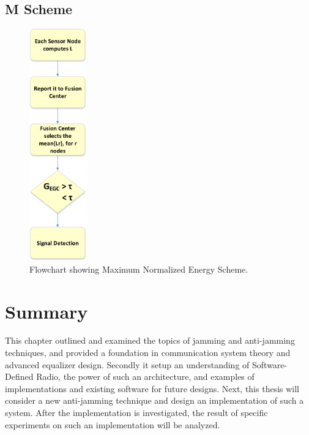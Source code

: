 \subsection{M Scheme}
\begin{figure}[ht!]
	\centering
	\includegraphics[width=\textwidth,height=10cm,keepaspectratio]{images/Gill/figs/egcscheme.eps}
\caption{Flowchart showing Maximum Normalized Energy Scheme.} 
\label{egcscheme}      
\end{figure}


\section{Summary}
This chapter outlined and examined the topics of jamming and anti-jamming techniques, and provided a foundation in communication system theory and advanced equalizer design.  Secondly it setup an understanding of Software-Defined Radio, the power of such an architecture, and examples of implementations and existing software for future designs.  Next, this thesis will consider a new anti-jamming technique and design an implementation of such a system.  After the implementation is investigated, the result of specific experiments on such an implementation will be analyzed.\\
